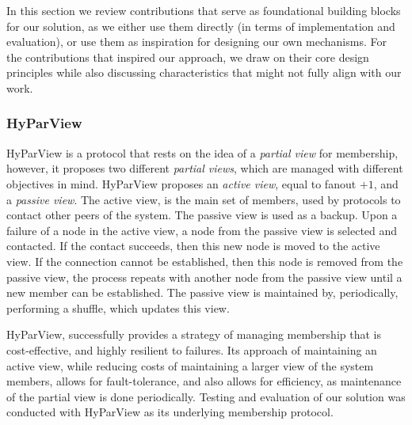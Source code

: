 In this section we review contributions that serve as foundational building blocks for our solution, as we either use them directly (in terms of implementation and evaluation), or use them as inspiration for designing our own mechanisms. For the contributions that inspired our approach, we draw on their core design principles while also discussing characteristics that might not fully align with our work.

\subsubsection{HyParView}
\label{sssec:hyparview}


HyParView\cite{Leitao2010} is a protocol that rests on the idea of a \textit{partial view} for membership, however, it proposes two different \textit{partial views}, which are managed with different objectives in mind. HyParView proposes an \textit{active view}, equal to fanout $+1$, and a \textit{passive view}. The active view, is the main set of members, used by protocols to contact other peers of the system. The passive view is used as a backup. Upon a failure of a node in the active view, a node from the passive view is selected and contacted. If the contact succeeds, then this new node is moved to the active view. If the connection cannot be established, then this node is removed from the passive view, the process repeats with another node from the passive view until a new member can be established. The passive view is maintained by, periodically, performing a shuffle, which updates this view.

HyParView, successfully provides a strategy of managing membership that is cost-effective, and highly resilient to failures. Its approach of maintaining an active view, while reducing costs of maintaining a larger view of the system members, allows for fault-tolerance, and also allows for efficiency, as maintenance of the partial view is done periodically. Testing and evaluation of our solution was conducted with HyParView as its underlying membership protocol.

